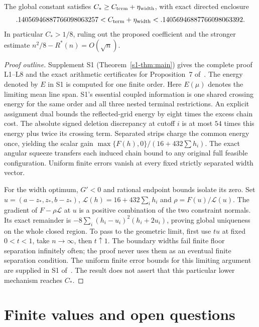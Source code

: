 \documentclass[review,hidelinks,onefignum,onetabnum]{siamart251216}
\newcommand{\Rstar}{R^\ast}
\newcommand{\CC}{C_\ast}
\begin{document}
\begin{proposition}\label{prop:lower}
The global constant satisfies $\CC\ge C_{\rm term}+\eta_{\rm width}$,
with exact directed enclosure
\[
 .14056946887766098063257
 < C_{\rm term}+\eta_{\rm width}
 < .14056946887766098063392.
\]
In particular $\CC>1/8$, ruling out the proposed coefficient
and the stronger estimate $n^2/8-\Rstar(n)=O(\sqrt n)$.
\end{proposition}
\begin{proof}[Proof outline]
Supplement S1 (Theorem~\ref{s1-thm:main}) gives the complete proof L1--L8 and the exact arithmetic
certificates for Proposition~7 of~\cite{supp}.
The energy denoted by $E$ in S1 is computed for one finite order. Here
$E(\mu)$ denotes the limiting mean line span. S1's essential coupled information is one shared crossing energy for the
same order and all three nested terminal restrictions. An explicit assignment
dual bounds the reflected-grid energy by eight times the excess chain cost.
The absolute signed deletion discrepancy at cutoff $i$ is at most $54$
times this energy plus twice its crossing term. Separated strips charge
the common energy once, yielding
the scalar gain $\max\{F(h),0\}/(16+432\sum h_i)$.
The exact angular squeeze transfers each induced chain bound to any original
full feasible configuration. Uniform finite errors vanish at every fixed
strictly separated width vector.

For the width optimum, $G'<0$ and rational endpoint bounds isolate its zero.
Set $u=(a-z_*,z_*,b-z_*)$, $\mathcal L(h)=16+432\sum_i h_i$ and
$\rho=F(u)/\mathcal L(u)$. The gradient of $F-\rho\mathcal L$ at $u$ is a positive
combination of the two constraint normals. Its exact remainder is
$-8\sum_i(h_i-u_i)^2(h_i+2u_i)$, proving global uniqueness on the whole
closed region. To pass to the geometric limit, first use $tu$ at fixed
$0<t<1$, take $n\to\infty$, then $t\uparrow1$. The boundary
widths fail finite floor separation infinitely often; the proof never uses
them as an eventual finite separation condition. The uniform finite error bounds for this
limiting argument are supplied in S1 of~\cite{supp}. The result does not assert
that this particular lower mechanism reaches $\CC$.
\end{proof}

\section{Finite values and open questions}
\end{document}
